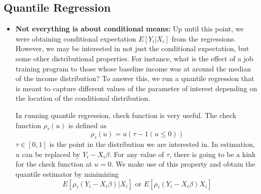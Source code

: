 \documentclass[12pt]{article}
\theoremstyle{definition}
\theoremstyle{property}
\theoremstyle{assumption}
\theoremstyle{example}
\theoremstyle{comment}
\begin{document}
\subsection{Quantile Regression}
\begin{itemize}
\item \textbf{Not everything is about conditional means:} Up until this point, we were obtaining conditional expectation $E[Y_i|X_i]$ from the regressions. However, we may be interested in not just the conditional expectation, but some other distributional properties. For instance, what is the effect of a job training program to those whose baseline income was at around the median of the income distribution? To answer this, we run a quantile regression that is meant to capture different values of the parameter of interest depending on the location of the conditional distribution. 
\par
In running quantile regression, check function is very useful. The check function $\rho_\tau(u)$ is defined as
\[
\rho_\tau(u)=u(\tau-1(u\leq0))
\]
$\tau\in[0,1]$ is the point in the distribution we are interested in. In estimation, $u$ can be replaced by $Y_i-X_i\beta$. For any value of $\tau$, there is going to be a kink for the check function at $u=0$. We make use of this property and obtain the quantile estimator by minimizing 
\[
E[\rho_\tau(Y_i-X_i\beta)|X_i] \text{ or }E[\rho_\tau(Y_i-X_i\beta)X_i]
\]
\end{itemize}
\end{document}

